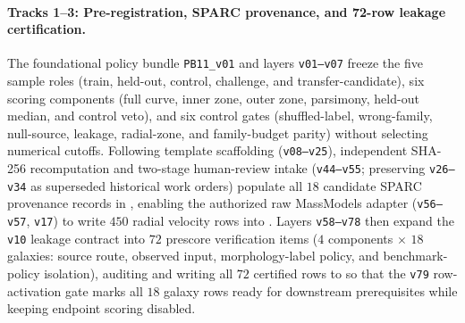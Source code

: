 \documentclass[11pt]{article}
\begin{document}
\paragraph{Tracks 1--3: Pre-registration, SPARC provenance, and 72-row leakage certification.}
The foundational policy bundle \texttt{PB11\_v01} and layers \texttt{v01--v07}
freeze the five sample roles (train, held-out, control, challenge, and
transfer-candidate), six scoring components (full curve, inner zone, outer
zone, parsimony, held-out median, and control veto), and six control gates
(shuffled-label, wrong-family, null-source, leakage, radial-zone, and
family-budget parity) without selecting numerical cutoffs. Following template
scaffolding (\texttt{v08--v25}), independent SHA-256 recomputation and
two-stage human-review intake (\texttt{v44--v55}; preserving \texttt{v26--v34}
as superseded historical work orders) populate all $18$ candidate SPARC
provenance records in ,
enabling the authorized raw MassModels adapter (\texttt{v56--v57}, \texttt{v17})
to write $450$ radial velocity rows into
. Layers \texttt{v58--v78}
then expand the \texttt{v10} leakage contract into $72$ prescore verification
items ($4$ components $\times$ $18$ galaxies: source route, observed input,
morphology-label policy, and benchmark-policy isolation), auditing and writing
all $72$ certified rows to  so
that the \texttt{v79} row-activation gate marks all $18$ galaxy rows ready for
downstream prerequisites while keeping endpoint scoring disabled.
\end{document}
